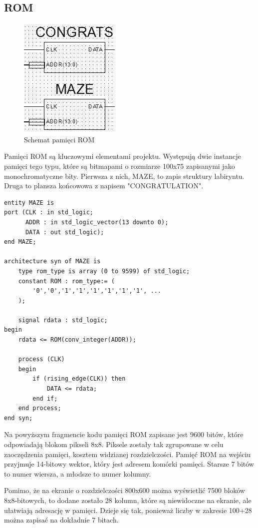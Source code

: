 \documentclass[11pt]{article}
\begin{document}
\subsection{ROM}

\begin{figure}[H]
\center
\includegraphics[scale=1]{ROM.png} 
\caption{Schemat pamięci ROM}
\end{figure}

Pamięci ROM są kluczowymi elementami projektu. Występują dwie instancje pamięci tego typu, które są bitmapami o rozmiarze 100x75 zapisanymi jako monochromatyczne bity.
Pierwsza z nich, MAZE, to zapis struktury labiryntu.
Druga to plansza końcowowa z napisem "CONGRATULATION".

\begin{lstlisting}[caption=Kod pamięci ROM]
entity MAZE is
port (CLK : in std_logic;
      ADDR : in std_logic_vector(13 downto 0);
      DATA : out std_logic);
end MAZE;

architecture syn of MAZE is
    type rom_type is array (0 to 9599) of std_logic;
    constant ROM : rom_type:= (
        '0','0','1','1','1','1','1','1', ...
    );

    signal rdata : std_logic;
begin
    rdata <= ROM(conv_integer(ADDR));

    process (CLK)
    begin
        if (rising_edge(CLK)) then
            DATA <= rdata;
        end if;
    end process;
end syn;
\end{lstlisting}

Na powyższym fragmencie kodu pamięci ROM zapisane jest 9600 bitów, które odpowiadają blokom pikseli 8x8.
Piksele zostały tak zgrupowane w celu zaoczędzenia pamięci, kosztem widzianej rozdzielczości.
Pamięć ROM na wejściu przyjmuje 14-bitowy wektor, który jest adresem komórki pamięci.
Starsze 7 bitów to numer wiersza, a młodsze to numer kolumny.

Pomimo, że na ekranie o rozdzielczości 800x600 można wyświetlić 7500 bloków 8x8-bitowych, to dodane zostało 28 kolumn, które są niewidoczne na ekranie, ale ułatwiają adresację w pamięci.
Dzieje się tak, ponieważ liczby w zakresie 100+28 można zapisać na dokładnie 7 bitach.
\end{document}
